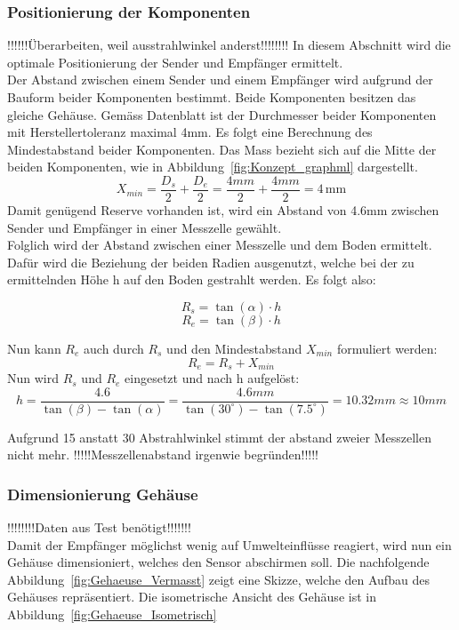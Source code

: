 \documentclass[main.tex]{subfiles} %
\begin{document}
\subsubsection{Positionierung der Komponenten}
!!!!!!Überarbeiten, weil ausstrahlwinkel anderst!!!!!!!!
In diesem Abschnitt wird die optimale Positionierung der Sender und Empfänger ermittelt.\\ 
Der Abstand zwischen einem Sender und einem Empfänger wird aufgrund der Bauform beider 
Komponenten bestimmt.
Beide Komponenten besitzen das gleiche Gehäuse. Gemäss Datenblatt ist der Durchmesser
beider Komponenten mit Herstellertoleranz maximal 4mm. Es folgt eine Berechnung des 
Mindestabstand beider Komponenten. Das Mass bezieht sich auf die Mitte der beiden 
Komponenten, wie in Abbildung~\ref{fig:Konzept_graphml} dargestellt.
\[ X_{min} = \frac{D_s}{2} + \frac{D_e}{2} = \frac{4mm}{2} + \frac{4mm}{2} = 4\,\text{mm} \]
Damit genügend Reserve vorhanden ist, wird ein Abstand von 4.6mm zwischen Sender und
Empfänger in einer Messzelle gewählt.\\

Folglich wird der Abstand zwischen einer Messzelle und dem Boden ermittelt. Dafür 
wird die Beziehung der beiden Radien ausgenutzt, welche bei der zu ermittelnden Höhe
h auf den Boden gestrahlt werden. Es folgt also:

\[
R_s = \tan(\alpha) \cdot h 
\]
\[
R_e = \tan(\beta) \cdot h
\]

Nun kann \( R_e \) auch durch \( R_s \) und den Mindestabstand \( X_{min} \) formuliert werden:
\[
    R_e = R_s + X_{min}
\]
Nun wird \( R_s \) und \( R_e \) eingesetzt und nach h aufgelöst:
\[
h = \frac{4.6}{\tan(\beta) - \tan(\alpha)} = \frac{4.6mm}{\tan(30^\circ) - \tan(7.5^\circ)} = 10.32{mm} \approx 10{mm}
\]

Aufgrund 15 anstatt 30 Abstrahlwinkel stimmt der abstand zweier Messzellen nicht mehr.
!!!!!Messzellenabstand irgenwie begründen!!!!!



\subsubsection{Dimensionierung Gehäuse}
!!!!!!!!Daten aus Test benötigt!!!!!!!\\
Damit der Empfänger möglichst wenig auf Umwelteinflüsse reagiert, wird nun ein 
Gehäuse dimensioniert, welches den Sensor abschirmen soll. Die nachfolgende 
Abbildung~\ref{fig:Gehaeuse_Vermasst} zeigt eine Skizze, welche den Aufbau des Gehäuses repräsentiert.
Die isometrische Ansicht des Gehäuse ist in Abbildung~\ref{fig:Gehaeuse_Isometrisch}
\end{document}

